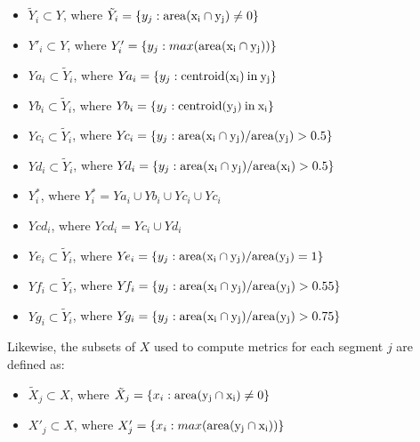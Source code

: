 \begin{itemize}
 
    \item $\tilde{Y}_{i} \subset{} Y$, where $\tilde{Y}_{i} = \{y_{j}: \rm{area}(x_{i} \cap y_{j}) \neq 0\}$

    \item $Y'_{i} \subset{} Y$, where $Y'_{i} = \{y_{j}: max(\rm{area}(x_{i} \cap y_{j}))\}$

    \item $Y\!a_{i} \subset{} \tilde{Y}_{i}$, where $Y\!a_{i} = \{y_{j}: \rm{centroid}(x_{i}) \:\rm{in}\: y_{j}\}$

    \item $Y\!b_{i} \subset{} \tilde{Y}_{i}$, where $Y\!b_{i} = \{y_{j}: \rm{centroid}(y_{j}) \:\rm{in}\: x_{i}\}$

    \item $Y\!c_{i} \subset{} \tilde{Y}_{i}$, where $Y\!c_{i} = \{y_{j}: \rm{area}(x_{i} \cap y_{j}) / \rm{area}(y_{j}) > 0.5\}$

    \item $Y\!d_{i} \subset{} \tilde{Y}_{i}$, where $Y\!d_{i} = \{y_{j}: \rm{area}(x_{i} \cap y_{j}) / \rm{area}(x_{i}) > 0.5\}$

    \item ${Y}^{*}_{i}$, where ${Y}^{*}_{i} = Y\!a_{i} \cup Y\!b_{i} \cup Y\!c_{i} \cup Y\!c_{i}$

    \item $Y\!cd_{i}$, where $Y\!cd_{i} = Y\!c_{i} \cup Y\!d_{i}$

    \item $Y\!e_{i} \subset{} \tilde{Y}_{i}$, where $Y\!e_{i} = \{y_{j}: \rm{area}(x_{i} \cap y_{j}) / \rm{area}(y_{j}) = 1\}$

    \item $Y\!f_{i} \subset{} \tilde{Y}_{i}$, where $Y\!f_{i} = \{y_{j}: \rm{area}(x_{i} \cap y_{j}) / \rm{area}(y_{j}) > 0.55\}$

    \item $Y\!g_{i} \subset{} \tilde{Y}_{i}$, where $Y\!g_{i} = \{y_{j}: \rm{area}(x_{i} \cap y_{j}) / \rm{area}(y_{j}) > 0.75\}$

\end{itemize}

Likewise, the subsets of $X$ used to compute metrics for each segment $j$ are defined as:

\begin{itemize}
    \item $\tilde{X}_{j} \subset{} X$, where $\tilde{X}_{j} = \{x_{i}: \rm{area}(y_{j} \cap x_{i}) \neq 0\}$

    \item $X'_{j} \subset{} X$, where $X'_{j} = \{x_{i}: max(\rm{area}(y_{j} \cap x_{i}))\}$
\end{itemize}

